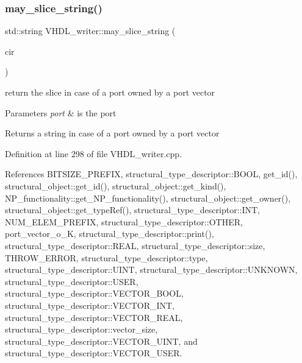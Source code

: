 \subsubsection{\texorpdfstring{may\+\_\+slice\+\_\+string()}{may\_slice\_string()}}
{\footnotesize\ttfamily std\+::string V\+H\+D\+L\+\_\+writer\+::may\+\_\+slice\+\_\+string (\begin{DoxyParamCaption}\item[{const \hyperlink{structural__objects_8hpp_a8ea5f8cc50ab8f4c31e2751074ff60b2}{structural\+\_\+object\+Ref} \&}]{cir }\end{DoxyParamCaption})}



return the slice in case of a port owned by a port vector 


\begin{DoxyParams}{Parameters}
{\em port} & is the port \\
\hline
\end{DoxyParams}
\begin{DoxyReturn}{Returns}
a string in case of a port owned by a port vector 
\end{DoxyReturn}


Definition at line 298 of file V\+H\+D\+L\+\_\+writer.\+cpp.



References B\+I\+T\+S\+I\+Z\+E\+\_\+\+P\+R\+E\+F\+IX, structural\+\_\+type\+\_\+descriptor\+::\+B\+O\+OL, get\+\_\+id(), structural\+\_\+object\+::get\+\_\+id(), structural\+\_\+object\+::get\+\_\+kind(), N\+P\+\_\+functionality\+::get\+\_\+\+N\+P\+\_\+functionality(), structural\+\_\+object\+::get\+\_\+owner(), structural\+\_\+object\+::get\+\_\+type\+Ref(), structural\+\_\+type\+\_\+descriptor\+::\+I\+NT, N\+U\+M\+\_\+\+E\+L\+E\+M\+\_\+\+P\+R\+E\+F\+IX, structural\+\_\+type\+\_\+descriptor\+::\+O\+T\+H\+ER, port\+\_\+vector\+\_\+o\+\_\+K, structural\+\_\+type\+\_\+descriptor\+::print(), structural\+\_\+type\+\_\+descriptor\+::\+R\+E\+AL, structural\+\_\+type\+\_\+descriptor\+::size, T\+H\+R\+O\+W\+\_\+\+E\+R\+R\+OR, structural\+\_\+type\+\_\+descriptor\+::type, structural\+\_\+type\+\_\+descriptor\+::\+U\+I\+NT, structural\+\_\+type\+\_\+descriptor\+::\+U\+N\+K\+N\+O\+WN, structural\+\_\+type\+\_\+descriptor\+::\+U\+S\+ER, structural\+\_\+type\+\_\+descriptor\+::\+V\+E\+C\+T\+O\+R\+\_\+\+B\+O\+OL, structural\+\_\+type\+\_\+descriptor\+::\+V\+E\+C\+T\+O\+R\+\_\+\+I\+NT, structural\+\_\+type\+\_\+descriptor\+::\+V\+E\+C\+T\+O\+R\+\_\+\+R\+E\+AL, structural\+\_\+type\+\_\+descriptor\+::vector\+\_\+size, structural\+\_\+type\+\_\+descriptor\+::\+V\+E\+C\+T\+O\+R\+\_\+\+U\+I\+NT, and structural\+\_\+type\+\_\+descriptor\+::\+V\+E\+C\+T\+O\+R\+\_\+\+U\+S\+ER.



